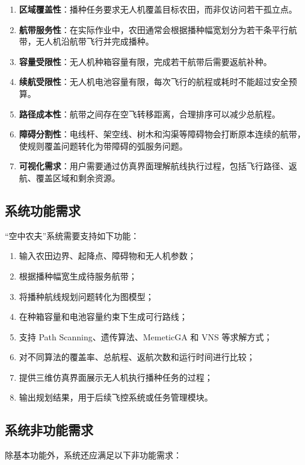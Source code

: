 \documentclass[UTF8,a4paper,12pt]{ctexart}
\begin{document}
\begin{enumerate}
    \item \textbf{区域覆盖性}：播种任务要求无人机覆盖目标农田，而非仅访问若干孤立点。
    \item \textbf{航带服务性}：在实际作业中，农田通常会根据播种幅宽划分为若干条平行航带，无人机沿航带飞行并完成播种。
    \item \textbf{容量受限性}：无人机种箱容量有限，完成若干航带后需要返航补种。
    \item \textbf{续航受限性}：无人机电池容量有限，每次飞行的航程或耗时不能超过安全预算。
    \item \textbf{路径成本性}：航带之间存在空飞转移距离，合理排序可以减少总航程。
    \item \textbf{障碍分割性}：电线杆、架空线、树木和沟渠等障碍物会打断原本连续的航带，使规则覆盖问题转化为带障碍的弧服务问题。
    \item \textbf{可视化需求}：用户需要通过仿真界面理解航线执行过程，包括飞行路径、返航、覆盖区域和剩余资源。
\end{enumerate}

\subsection{系统功能需求}

“空中农夫”系统需要支持如下功能：

\begin{enumerate}
    \item 输入农田边界、起降点、障碍物和无人机参数；
    \item 根据播种幅宽生成待服务航带；
    \item 将播种航线规划问题转化为图模型；
    \item 在种箱容量和电池容量约束下生成可行路线；
    \item 支持 Path Scanning、遗传算法、MemeticGA 和 VNS 等求解方式；
    \item 对不同算法的覆盖率、总航程、返航次数和运行时间进行比较；
    \item 提供三维仿真界面展示无人机执行播种任务的过程；
    \item 输出规划结果，用于后续飞控系统或任务管理模块。
\end{enumerate}

\subsection{系统非功能需求}

除基本功能外，系统还应满足以下非功能需求：
\end{document}
